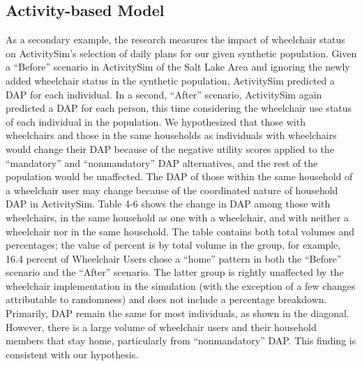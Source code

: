 \documentclass[3p, authoryear, review]{elsarticle} %
\begin{document}
\hypertarget{activity-based-model}{%
\subsection{Activity-based Model}\label{activity-based-model}}

As a secondary example, the research measures the impact of
wheelchair status on ActivitySim's selection of daily plans for our given
synthetic population. Given a ``Before'' scenario in ActivitySim of the Salt Lake
Area and ignoring the newly added wheelchair status in the synthetic population,
ActivitySim predicted a DAP for each individual. In a second, ``After'' scenario,
ActivitySim again predicted a DAP for each person, this time considering the
wheelchair use status of each individual in the population. We hypothesized that
those with wheelchairs and those in the same households as individuals with
wheelchairs would change their DAP because of the negative utility scores
applied to the ``mandatory'' and ``nonmandatory'' DAP alternatives, and the rest of
the population would be unaffected. The DAP of those within the same household
of a wheelchair user may change because of the coordinated nature of household
DAP in ActivitySim. Table 4-6 shows the change in DAP among those with
wheelchairs, in the same household as one with a wheelchair, and with neither a
wheelchair nor in the same household. The table contains both total volumes and
percentages; the value of percent is by total volume in the group, for example,
16.4 percent of Wheelchair Users chose a ``home'' pattern in both the ``Before''
scenario and the ``After'' scenario. The latter group is rightly unaffected by
the wheelchair implementation in the simulation (with the exception of a few
changes attributable to randomness) and does not include a percentage breakdown.
Primarily, DAP remain the same for most individuals, as shown in the diagonal.
However, there is a large volume of wheelchair users and their household members
that stay home, particularly from ``nonmandatory'' DAP. This finding is consistent
with our hypothesis.
\end{document}
